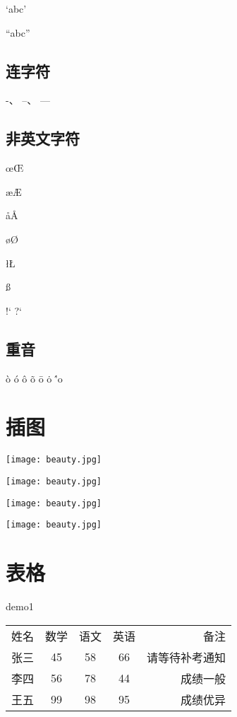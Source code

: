 \documentclass[UTF8]{ctexart}
\begin{document}
    `abc'

    ``abc''

    \subsection{连字符}

    -、
    --、
    ---

    \subsection{非英文字符}

    \oe \OE
    
    \ae \AE
    
    \aa \AA

    \o \O
    
    \l \L

    \ss \SS

    !` ?`

    \subsection{重音}

    \`o \'o  \^o \~o \=o \.o \''o

    \section{插图}
    
    \texttt{[image: beauty.jpg]}

    \texttt{[image: beauty.jpg]}

    \texttt{[image: beauty.jpg]}

    \texttt{[image: beauty.jpg]}

    \section{表格}

    demo1

    \begin{tabular}{l c c c r}
            姓名 & 数学 & 语文 & 英语 & 备注
        \\  张三 & 45 & 58 & 66 & 请等待补考通知
        \\  李四 & 56 & 78 & 44 & 成绩一般
        \\  王五 & 99 & 98 & 95 & 成绩优异
        \end{tabular}
    
\end{document}
